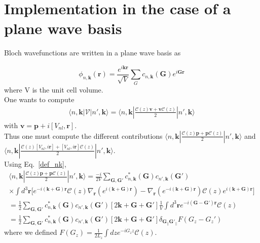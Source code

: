 \documentclass[a4paper,11pt]{report}
\renewcommand{\vec}[1]{\mathbf{#1}}
\newcommand{\bra}{\langle}
\newcommand{\ket}{\rangle}
\begin{document}
\chapter*{Implementation in the case of a plane wave basis}

Bloch wavefunctions are written in a plane wave basis as

\begin{equation}
  \phi_{n,\vec{k}}(\vec{r}) = \frac{e^{i\vec{k}\vec{r}}}{\sqrt{V}}
\sum_{G} c_{n,\vec{k}}(\vec{G})e^{i\vec{G}\vec{r}}
\label{def_nk}
\end{equation}
where V is the unit cell volume.\\
One wants to compute
\begin{eqnarray}
  \bra n,\vec{k}|\vec{\mathcal{V}}|n',\vec{k}\ket = \bra
n,\vec{k}|\frac{\mathcal{C}(z)\vec{v}+\vec{v}\mathcal{C}(z)}{2}|n',\vec{k}\ket
\end{eqnarray}
with $\vec{v}=\vec{p}+i[V_{nl},\vec{r}]$.\\
Thus one must compute the different contributions $\bra
n,\vec{k}|\frac{\mathcal{C}(z)\vec{p}+\vec{p}\mathcal{C}(z)}{2}|n',\vec{k}\ket$
and $\bra
n,\vec{k}|\frac{\mathcal{C}(z)[V_{nl},i\vec{r}]+[V_{nl},i\vec{r}]\mathcal{C}(z)}{2}|n',\vec{k}\ket$.
\\

Using Eq.~\ref{def_nk},
\begin{eqnarray}
  \bra
n,\vec{k}|\frac{\mathcal{C}(z)\vec{p}+\vec{p}\mathcal{C}(z)}{2}|n',\vec{k}\ket
= \frac{-i}{2V}\sum_{\vec{G},\vec{G'}}
c^*_{n,\vec{k}}(\vec{G})c_{n',\vec{k}}(\vec{G'}) \nonumber\\
\times\int d^3\vec{r} \Bigg[e^{-i(\vec{k}+\vec{G})\vec{r}}
\mathcal{C}(z) \nabla_{\vec{r}} (e^{i(\vec{k}+\vec{G})\vec{r}}) -
\nabla_{\vec{r}} (e^{-i(\vec{k}+\vec{G})\vec{r}} ) \mathcal{C}(z)
e^{i(\vec{k}+\vec{G})\vec{r}}\Bigg]\nonumber\\
  = \frac{1}{2}\sum_{\vec{G},\vec{G'}}
c^*_{n,\vec{k}}(\vec{G})c_{n',\vec{k}}(\vec{G'})
\left[2\vec{k}+\vec{G}+\vec{G'} \right]\frac{1}{V}\int d^3\vec{r}
e^{-i(\vec{G}-\vec{G'})\vec{r}} \mathcal{C}(z)\nonumber\\
  = \frac{1}{2}\sum_{\vec{G},\vec{G'}}
c^*_{n,\vec{k}}(\vec{G})c_{n',\vec{k}}(\vec{G'})
\left[2\vec{k}+\vec{G}+\vec{G'} \right]
\delta_{\vec{G}_{||}\vec{G'}_{||}} F(G_z-G_z')
\end{eqnarray}
where we defined $F(G_z)=\frac{1}{2L_z}\int dz e^{-iG_z z} \mathcal{C}(z)$.
\end{document}
